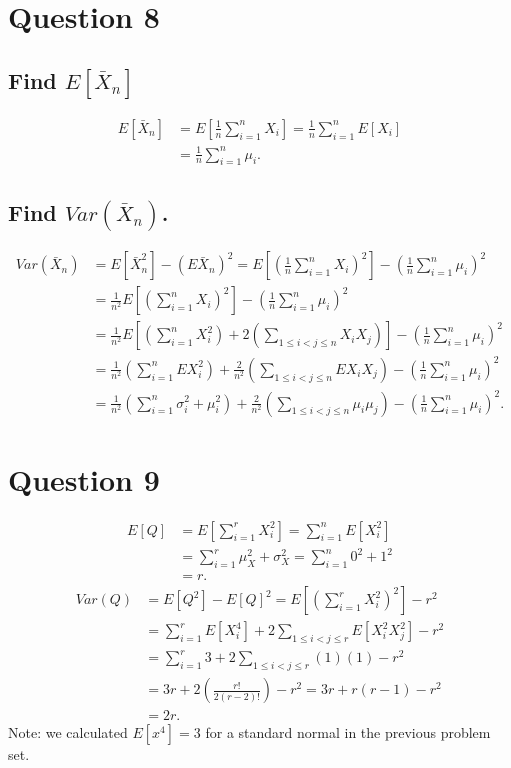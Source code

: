 \documentclass[11pt]{article} %
\begin{document}
\section{Question 8}
\subsection{Find $E[\bar{X}_n]$}
\begin{align*}
E[\bar{X}_n] &= E\left[\frac{1}{n} \sum_{i=1}^{n} X_i \right] = \frac{1}{n}\sum_{i=1}^{n} E\left[X_i \right] \\
&= \frac{1}{n}\sum_{i=1}^{n} \mu_i.
\end{align*}
\subsection{Find $Var(\bar{X}_n)$.}
\begin{align*}
Var(\bar{X}_n) &= E[\bar{X}_n^2] - (E\bar{X}_n)^2 = E\left[\left(\frac{1}{n} \sum_{i=1}^{n} X_i\right)^2\right]  - \left(\frac{1}{n}\sum_{i=1}^{n}  \mu_i\right)^2 \\
&= \frac{1}{n^2}E\left[\left( \sum_{i=1}^{n} X_i\right)^2\right]  - \left(\frac{1}{n}\sum_{i=1}^{n}  \mu_i\right)^2 \\
&= \frac{1}{n^2}E\left[\left( \sum_{i=1}^{n} X_i^2\right) + 2\left(\sum_{1\leq i<j \leq n} X_iX_j\right)  \right]  - \left(\frac{1}{n}\sum_{i=1}^{n}  \mu_i\right)^2\\
&= \frac{1}{n^2}\left( \sum_{i=1}^{n} EX_i^2\right) + \frac{2}{n^2}\left(\sum_{1\leq i<j \leq n} EX_iX_j\right)    - \left(\frac{1}{n}\sum_{i=1}^{n}  \mu_i\right)^2\\
&= \frac{1}{n^2}\left( \sum_{i=1}^{n} \sigma_i^2 + \mu_i^2\right) + \frac{2}{n^2}\left(\sum_{1\leq i<j \leq n} \mu_i \mu_j\right)    - \left(\frac{1}{n}\sum_{i=1}^{n}  \mu_i\right)^2.
\end{align*}
\section{Question 9}
\begin{align*}
E[Q] &= E\left[ \sum_{i=1}^r X_i^2 \right] = \sum_{i=1}^n E\left[ X_i^2 \right]  \\
&=  \sum_{i=1}^r \mu_X^2 + \sigma_X^2 = \sum_{i=1}^n 0^2 + 1^2\\
&=  r.
\end{align*}
\begin{align*}
Var(Q) &= E[Q^2] - E[Q]^2 = E\left[\left(\sum_{i=1}^r X_i^2 \right)^2\right] - r^2\\
&= \sum_{i=1}^r E\left[X_i^4\right] + 2\sum_{1\leq i < j \leq r}E\left[ X_i^2X_j^2\right] -r^2 \\
&= \sum_{i=1}^r 3 + 2\sum_{1\leq i < j \leq r}(1)(1) -r^2 \\
&= 3r + 2\left( \frac{r!}{2(r-2)!}\right) -r^2 = 3r + r(r-1) -r^2 \\
&= 2r.
\end{align*}
Note: we calculated $E[x^4]=3$ for a standard normal in the previous problem set.
\end{document}
